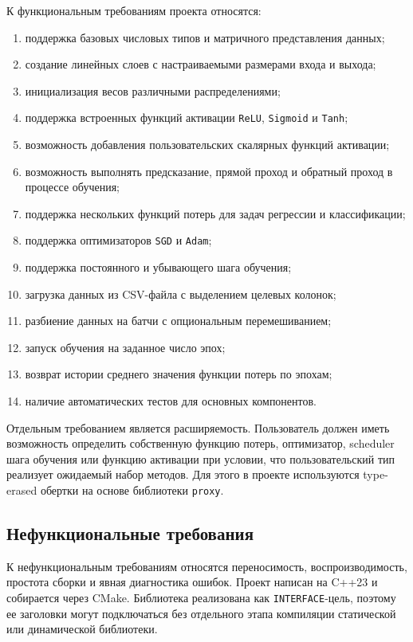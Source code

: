 \documentclass{article}
\begin{document}
К функциональным требованиям проекта относятся:
\begin{enumerate}
    \item поддержка базовых числовых типов и матричного представления
        данных; 
    \item создание линейных слоев с настраиваемыми
        размерами входа и выхода;
    \item инициализация весов различными распределениями;
    \item поддержка встроенных функций активации \texttt{ReLU},
        \texttt{Sigmoid} и \texttt{Tanh};
    \item возможность добавления пользовательских скалярных функций
        активации;
    \item возможность выполнять предсказание, прямой проход и
        обратный проход в процессе обучения;
    \item поддержка нескольких функций потерь для задач регрессии и
        классификации;
    \item поддержка оптимизаторов \texttt{SGD} и \texttt{Adam};
    \item поддержка постоянного и убывающего шага обучения;
    \item загрузка данных из CSV-файла с выделением целевых колонок;
    \item разбиение данных на батчи с опциональным перемешиванием;
    \item запуск обучения на заданное число эпох;
    \item возврат истории среднего значения функции потерь по эпохам;
    \item наличие автоматических тестов для основных компонентов.
\end{enumerate}

Отдельным требованием является расширяемость. Пользователь должен
иметь возможность определить собственную функцию потерь, оптимизатор,
scheduler шага обучения или функцию активации при условии, что
пользовательский тип реализует ожидаемый набор методов. Для этого в
проекте используются type-erased обертки на основе библиотеки
\texttt{proxy}.

\subsection{Нефункциональные требования}

К нефункциональным требованиям относятся переносимость,
воспроизводимость, простота сборки и явная диагностика ошибок. Проект
написан на C++23 и собирается через CMake. Библиотека реализована как
\texttt{INTERFACE}-цель, поэтому ее заголовки могут подключаться без
отдельного этапа компиляции статической или динамической библиотеки.
\end{document}
